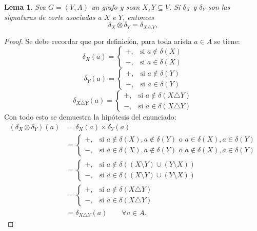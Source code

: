 \documentclass[11pt,a4paper,spanish]{report}
\theoremstyle{plain}
\newtheorem{lema}[teorema]{Lema}
\begin{document}
\begin{lema}\label{lema:delta-diferencia-simetrica}
Sea $G=(V,A)$ un grafo y sean $X,Y\subseteq V$.  
Si $\delta_X$ y $\delta_Y$ son las signaturas de corte asociadas a $X$ e $Y$, entonces
\[
\delta_X \otimes \delta_Y = \delta_{X\triangle Y},
\]
\end{lema}

\begin{proof}
Se debe recordar que por definición, para toda arista $a\in A$ se tiene:
\[
\delta_X(a)=
\begin{cases}
+, & \text{si } a\notin \delta(X)\\
-, & \text{si } a  \in \delta(X)
\end{cases}
\]
\[
\delta_Y(a)=
\begin{cases}
+, & \text{si } a\notin \delta(Y)\\
-, & \text{si } a  \in \delta(Y)
\end{cases}
\]
\[
\delta_{X\triangle Y}(a)=
\begin{cases}
+, & \text{si } a\notin \delta(X\triangle Y)\\
-, & \text{si } a  \in \delta(X\triangle Y)
\end{cases}
\]
Con todo esto se demuestra la hipótesis del enunciado:
\begin{align*}
(\delta_X \otimes \delta_Y)(a) &= \delta_X(a) \times \delta_Y(a) \\
&= \begin{cases}
+, & \text{si } a \notin \delta(X), a \notin \delta(Y) \text{ o } a \in \delta(X), a \in \delta(Y) \\
-, & \text{si } a \in \delta(X), a \notin \delta(Y) \text{ o } a \notin \delta(X), a \in \delta(Y) 
\end{cases} \\
&= \begin{cases}
+, & \text{si } a \notin \delta((X \setminus Y) \cup (Y \setminus X)) \\
-, & \text{si } a \in \delta((X \setminus Y) \cup (Y \setminus X))
\end{cases} \\
&= \begin{cases}
+, & \text{si } a \notin \delta(X \triangle Y) \\
-, & \text{si } a \in \delta(X \triangle Y)
\end{cases} \\
&= \delta_{X \triangle Y}(a) \qquad \forall a \in A.
\end{align*}
\end{proof}
\end{document}
